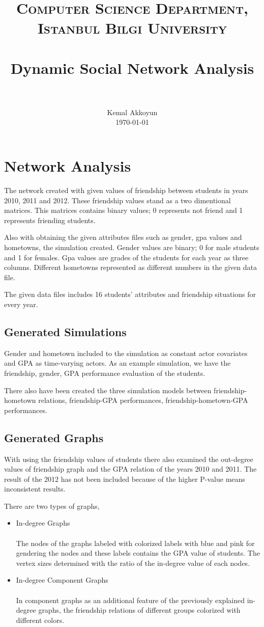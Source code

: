 \documentclass[paper=a4, fontsize=11pt]{scrartcl}	%
\title{
		\usefont{OT1}{bch}{b}{n}
		\normalfont \normalsize \textsc{Computer Science Department, Istanbul Bilgi University} \\ [25pt]
		\horrule{0.5pt} \\[0.4cm]
		\huge Dynamic Social Network Analysis \\
		\horrule{2pt} \\[0.5cm]
}
\author{
		\normalfont 								\normalsize
        Kemal Akkoyun\\[-3pt]		\normalsize
        \today
}
\date{}
\numberwithin{equation}{section}		%
\numberwithin{figure}{section}			%
\numberwithin{table}{section}				%
\begin{document}
\maketitle
\section{Network Analysis}
The network created with given values of friendship between students in years 2010, 2011 and 2012. These friendship values stand as a two dimentional matrices. This matrices contains binary values; 0 represents not friend and 1 represents friending students.

Also with obtaining the given attributes files such as gender, gpa values and hometowns, the simulation created. Gender values are binary; 0 for male students and 1 for females. Gpa values are grades of the students for each year as three columns. Different hometowns represented as different numbers in the given data file.

The given data files includes 16 students' attributes and friendship situations for every year.

\subsection{Generated Simulations}
Gender and hometown included to the simulation as constant actor covariates and GPA as time-varying actors. As an example simulation, we have the friendship, gender, GPA performance evaluation of the students. 

There also have been created the three simulation models between friendship-hometown relations, friendship-GPA performances, friendship-hometown-GPA performances.

\subsection{Generated Graphs}
With using the friendship values of students there also examined the out-degree values of friendship graph and the GPA relation of the years 2010 and 2011. The result of the 2012 has not been included because of the higher P-value means inconsistent results.

There are two types of graphs,
\begin{itemize}
\item In-degree Graphs
\paragraph{} The nodes of the graphs labeled with colorized labels with blue and pink for gendering the nodes and these labels contains the GPA value of students. The vertex sizes determined with the ratio of the in-degree value of each nodes.
\item In-degree Component Graphs
\paragraph{} In component graphs as an additional feature of the previously explained in-degree graphs, the friendship relations of different groups colorized with different colors.
\end{itemize}
\end{document}
